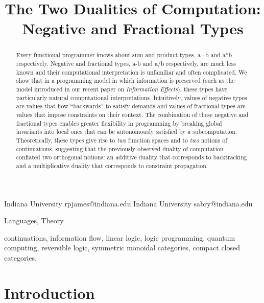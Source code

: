 \documentclass[preprint]{sigplanconf}
\begin{document}
\CopyrightYear{}
\copyrightdata{}
\titlebanner{}
\preprintfooter{}

\title{The Two Dualities of Computation: Negative and Fractional Types}
           {Indiana University}
           {rpjames@indiana.edu}
           {Indiana University}
           {sabry@indiana.edu}
\maketitle

\begin{abstract}
  Every functional programmer knows about sum and product types, {{a+b}} and
  {{a*b}} respectively. Negative and fractional types, {{a-b}} and {{a/b}}
  respectively, are much less known and their computational interpretation is
  unfamiliar and often complicated. We show that in a programming model in
  which information is preserved (such as the model introduced in our recent
  paper on \emph{Information Effects}), these types have particularly natural
  computational interpretations. Intuitively, values of negative types are
  values that flow ``backwards'' to satisfy demands and values of fractional
  types are values that impose constraints on their context.  The combination
  of these negative and fractional types enables greater flexibility in
  programming by breaking global invariants into local ones that can be
  autonomously satisfied by a subcomputation. Theoretically, these types give
  rise to \emph{two} function spaces and to \emph{two} notions of
  continuations, suggesting that the previously observed duality of
  computation conflated two orthogonal notions: an additive duality that
  corresponds to backtracking and a multiplicative duality that corresponds
  to constraint propagation.
\end{abstract}





\terms
Languages, Theory

\keywords continuations, information flow, linear logic, logic programming,
quantum computing, reversible logic, symmetric monoidal categories, compact
closed categories.

\section{Introduction}
\end{document}
